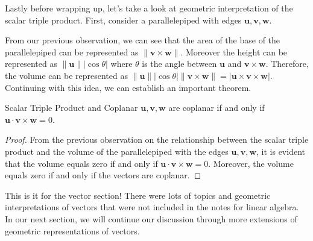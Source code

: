 \documentclass[../../main.tex]{subfiles}
\begin{document}
Lastly before wrapping up, let's take a look at geometric
interpretation of the scalar triple product. First, consider
a parallelepiped with edges $\mathbf{u}, \mathbf{v}, \mathbf{w}$.

From our previous observation, we can see that the area of the
base of the parallelepiped can be represented as $\| \mathbf{v}
\times \mathbf{w} \|$. Moreover the height can be represented
as $\| \mathbf{u} \| | \cos\theta |$ where $\theta$ is the
angle between $\mathbf{u}$ and $\mathbf{v} \times \mathbf{w}$.
Therefore, the volume can be represented as $\| \mathbf{u} \|
| \cos\theta | \| \mathbf{v} \times \mathbf{w} \| = | \mathbf{u}
\times \mathbf{v} \times \mathbf{w} |$. Continuing with this
idea, we can establish an important theorem.

\begin{theorem}{}{Scalar Triple Product and Coplanar}
$\mathbf{u}, \mathbf{v}, \mathbf{w}$ are coplanar if and only
if $\mathbf{u} \cdot \mathbf{v} \times \mathbf{w} = 0$.
\end{theorem}
\begin{proof}
From the previous observation on the relationship between
the scalar triple product and the volume of the parallelepiped
with the edges $\mathbf{u}, \mathbf{v}, \mathbf{w}$, it is
evident that the volume equals zero if and only if
$\mathbf{u} \cdot \mathbf{v} \times \mathbf{w} = 0$. Moreover,
the volume equals zero if and only if the vectors are coplanar.
\end{proof}

This is it for the vector section! There were lots of topics and
geometric interpretations of vectors that were not included in the
notes for linear algebra. In our next section, we will continue
our discussion through more extensions of geometric representations
of vectors.
\end{document}

